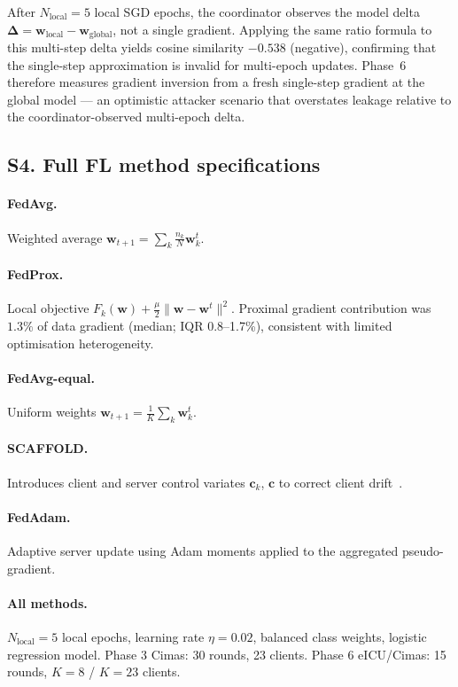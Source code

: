 After $N_\text{local}=5$ local SGD epochs, the coordinator observes the
model delta $\boldsymbol{\Delta} = \mathbf{w}_\text{local} - \mathbf{w}_\text{global}$,
not a single gradient.
Applying the same ratio formula to this multi-step delta yields
cosine similarity $-0.538$ (negative), confirming that the
single-step approximation is invalid for multi-epoch updates.
Phase~6 therefore measures gradient inversion from a fresh
single-step gradient at the global model --- an optimistic attacker
scenario that overstates leakage relative to the coordinator-observed
multi-epoch delta.

\subsection*{S4. Full FL method specifications}

\paragraph{FedAvg.}
Weighted average $\mathbf{w}_{t+1} = \sum_k \frac{n_k}{N}\mathbf{w}_k^t$.

\paragraph{FedProx.}
Local objective $F_k(\mathbf{w}) + \frac{\mu}{2}\|\mathbf{w}-\mathbf{w}^t\|^2$.
Proximal gradient contribution was $1.3\%$ of data gradient (median;
IQR 0.8--1.7\%), consistent with limited optimisation heterogeneity.

\paragraph{FedAvg-equal.}
Uniform weights $\mathbf{w}_{t+1} = \frac{1}{K}\sum_k \mathbf{w}_k^t$.

\paragraph{SCAFFOLD.}
Introduces client and server control variates $\mathbf{c}_k$, $\mathbf{c}$
to correct client drift~\cite{TODO:karimireddy2020scaffold}.

\paragraph{FedAdam.}
Adaptive server update using Adam moments applied to the aggregated
pseudo-gradient.

\paragraph{All methods.}
$N_\text{local}=5$ local epochs, learning rate $\eta=0.02$,
balanced class weights, logistic regression model.
Phase 3 Cimas: 30 rounds, 23 clients.
Phase 6 eICU/Cimas: 15 rounds, $K=8$ / $K=23$ clients.

